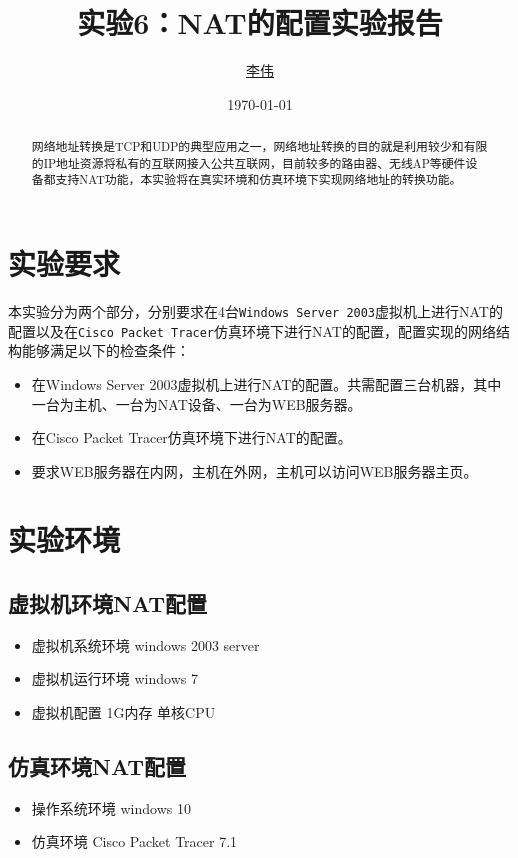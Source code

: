\documentclass[lang=cn,11pt]{elegantpaper}
\title{实验6：NAT的配置实验报告}
\author{\href{https://github.com/Jack-Lio}{李伟}}
\institute{1711350   计算机科学与技术一班}
\date{\today}
\begin{document}
\maketitle

\begin{abstract}
\noindent 网络地址转换是TCP和UDP的典型应用之一，网络地址转换的目的就是利用较少和有限的IP地址资源将私有的互联网接入公共互联网，目前较多的路由器、无线AP等硬件设备都支持NAT功能，本实验将在真实环境和仿真环境下实现网络地址的转换功能。
\end{abstract}


\section{实验要求}

本实验分为两个部分，分别要求在4台\lstinline{Windows Server 2003}虚拟机上进行NAT的配置以及在\lstinline{Cisco Packet Tracer}仿真环境下进行NAT的配置，配置实现的网络结构能够满足以下的检查条件：
\begin{itemize}
	\item 在Windows Server 2003虚拟机上进行NAT的配置。共需配置三台机器，其中一台为主机、一台为NAT设备、一台为WEB服务器。
	\item 在Cisco Packet Tracer仿真环境下进行NAT的配置。
	\item 要求WEB服务器在内网，主机在外网，主机可以访问WEB服务器主页。
\end{itemize}

\section{实验环境}
\subsection{虚拟机环境NAT配置}
\begin{itemize}
	\item 虚拟机系统环境 windows 2003 server
	\item 虚拟机运行环境 windows 7
	\item 虚拟机配置 1G内存 单核CPU
\end{itemize}
\subsection{仿真环境NAT配置}
\begin{itemize}
	\item 操作系统环境 windows 10 
	\item 仿真环境 Cisco Packet Tracer 7.1
\end{itemize}
\end{document}
